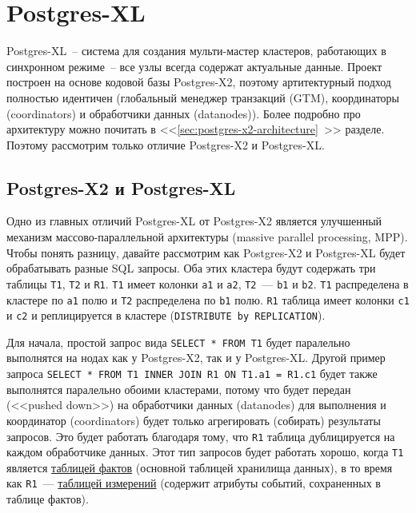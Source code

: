\section{Postgres-XL}
\label{sec:postgres-xl}

Postgres-XL~-- система для создания мульти-мастер кластеров, работающих в синхронном режиме~-- все узлы всегда содержат актуальные данные. Проект построен на основе кодовой базы Postgres-X2, поэтому артитектурный подход полностью идентичен (глобальный менеджер транзакций (GTM), координаторы (coordinators) и обработчики данных (datanodes)). Более подробно про архитектуру можно почитать в <<\ref{sec:postgres-x2-architecture}~>> разделе. Поэтому рассмотрим только отличие Postgres-X2 и Postgres-XL.


\subsection{Postgres-X2 и Postgres-XL}

Одно из главных отличий Postgres-XL от Postgres-X2 является улучшенный механизм массово-параллельной архитектуры (massive parallel processing, MPP). Чтобы понять разницу, давайте рассмотрим как Postgres-X2 и Postgres-XL будет обрабатывать разные SQL запросы. Оба этих кластера будут содержать три таблицы \lstinline!T1!, \lstinline!T2! и \lstinline!R1!. \lstinline!T1! имеет колонки \lstinline!a1! и \lstinline!a2!, \lstinline!T2!~--- \lstinline!b1! и \lstinline!b2!. \lstinline!T1! распределена в кластере по \lstinline!a1! полю и \lstinline!T2! распределена по \lstinline!b1! полю. \lstinline!R1! таблица имеет колонки \lstinline!c1! и \lstinline!c2! и реплицируется в кластере (\lstinline!DISTRIBUTE by REPLICATION!).

Для начала, простой запрос вида \lstinline!SELECT * FROM T1! будет паралельно выполнятся на нодах как у Postgres-X2, так и у Postgres-XL. Другой пример запроса \lstinline!SELECT * FROM T1 INNER JOIN R1 ON T1.a1 = R1.c1! будет также выполнятся паралельно обоими кластерами, потому что будет передан (<<pushed down>>) на обработчики данных (datanodes) для выполнения и координатор (coordinators) будет только агрегировать (собирать) результаты запросов. Это будет работать благодаря тому, что \lstinline!R1! таблица дублицируется на каждом обработчике данных. Этот тип запросов будет работать хорошо, когда \lstinline!T1! является \href{https://en.wikipedia.org/wiki/Fact\_table}{таблицей фактов} (основной таблицей хранилища данных), в то время как \lstinline!R1!~--- \href{https://en.wikipedia.org/wiki/Dimension\_(data\_warehouse)#Dimension\_table}{таблицей измерений} (содержит атрибуты событий, сохраненных в таблице фактов).

